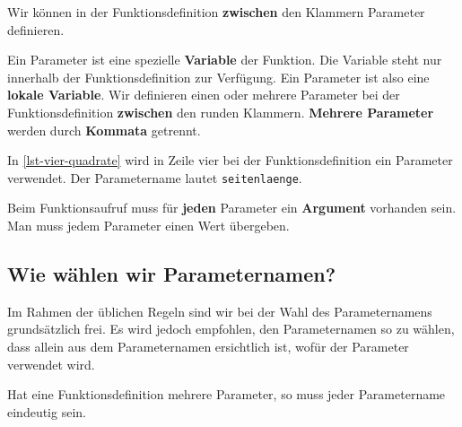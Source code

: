 Wir können in der Funktionsdefinition \textbf{zwischen} den Klammern Parameter definieren.

\begin{definition}[Parameter]
Ein Parameter ist eine spezielle \textbf{Variable} der Funktion. Die Variable steht nur innerhalb der Funktionsdefinition zur Verfügung. Ein Parameter ist also eine \textbf{lokale Variable}. Wir definieren einen oder mehrere Parameter bei der Funktionsdefinition \textbf{zwischen} den runden Klammern. \textbf{Mehrere Parameter} werden durch \textbf{Kommata} getrennt.
\end{definition}

\begin{example}
In \autoref{lst-vier-quadrate} wird in Zeile vier bei der Funktionsdefinition ein Parameter verwendet. Der Parametername lautet \lstinline[language={python3}]{seitenlaenge}.
\end{example}

\begin{important}
Beim Funktionsaufruf muss für \textbf{jeden} Parameter ein \textbf{Argument} vorhanden sein. Man muss jedem Parameter einen Wert übergeben.
\end{important}

\subsection{Wie wählen wir Parameternamen?}

Im Rahmen der üblichen Regeln sind wir bei der Wahl des Parameternamens grundsätzlich frei. Es wird jedoch empfohlen, den Parameternamen so zu wählen, dass allein aus dem Parameternamen ersichtlich ist, wofür der Parameter verwendet wird.

\vspace{-0.25cm}


\vspace{-0.25cm}

\begin{important}
Hat eine Funktionsdefinition mehrere Parameter, so muss jeder Parametername eindeutig sein.
\end{important}

